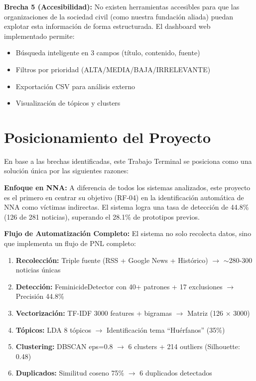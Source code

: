 \textbf{Brecha 5 (Accesibilidad):} No existen herramientas accesibles para que las organizaciones de la sociedad civil (como nuestra fundación aliada) puedan explotar esta información de forma estructurada. El dashboard web implementado permite:
\begin{itemize}
    \item Búsqueda inteligente en 3 campos (título, contenido, fuente)
    \item Filtros por prioridad (ALTA/MEDIA/BAJA/IRRELEVANTE)
    \item Exportación CSV para análisis externo
    \item Visualización de tópicos y clusters
\end{itemize}

\section{Posicionamiento del Proyecto}
\label{sec:posicionamiento}

En base a las brechas identificadas, este Trabajo Terminal se posiciona como una solución única por las siguientes razones:

\textbf{Enfoque en NNA:} A diferencia de todos los sistemas analizados, este proyecto es el primero en centrar su objetivo (RF-04) en la identificación automática de NNA como víctimas indirectas. El sistema logra una tasa de detección de 44.8\% (126 de 281 noticias), superando el 28.1\% de prototipos previos.
    
\textbf{Flujo de Automatización Completo:} El sistema no solo recolecta datos, sino que implementa un flujo de PNL completo:
\begin{enumerate}
    \item \textbf{Recolección:} Triple fuente (RSS + Google News + Histórico) $\rightarrow$ $\sim$280-300 noticias únicas
    \item \textbf{Detección:} FeminicideDetector con 40+ patrones + 17 exclusiones $\rightarrow$ Precisión 44.8\%
    \item \textbf{Vectorización:} TF-IDF 3000 features + bigramas $\rightarrow$ Matriz (126 × 3000)
    \item \textbf{Tópicos:} LDA 8 tópicos $\rightarrow$ Identificación tema ``Huérfanos'' (35\%)
    \item \textbf{Clustering:} DBSCAN eps=0.8 $\rightarrow$ 6 clusters + 214 outliers (Silhouette: 0.48)
    \item \textbf{Duplicados:} Similitud coseno 75\% $\rightarrow$ 6 duplicados detectados
\end{enumerate}

